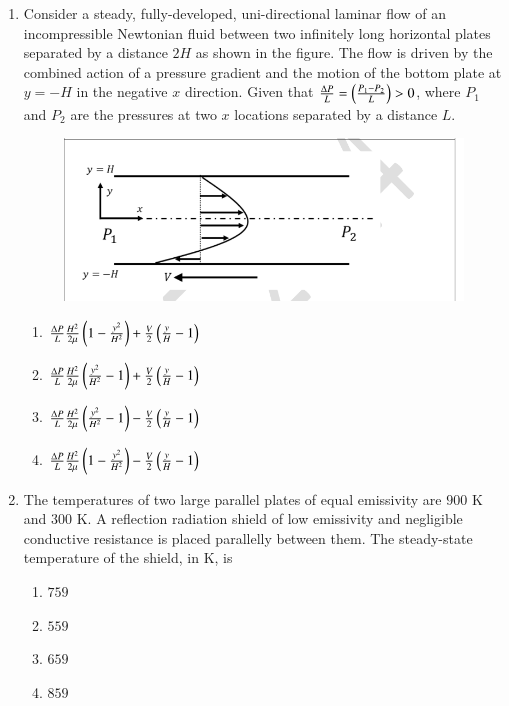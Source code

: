 \documentclass[journal,12pt,onecolumn]{IEEEtran}
\theoremstyle{remark}
\begin{document}
\begin{enumerate}
		\item Consider a steady, fully-developed, uni-directional laminar flow of an incompressible Newtonian fluid  between two infinitely long horizontal plates separated by a distance $2H$ as shown in the figure. The flow is driven by the combined action of a pressure gradient and the motion of the bottom plate at $y=-H$ in the negative $x$ direction. Given that $\frac{\Delta P}{L} = \left(\frac{P_1-P_2}{L}\right) > 0$, where $P_1$ and $P_2$ are the pressures at two $x$ locations separated by a distance $L$.
	\begin{figure}
		\includegraphics[width = 0.8\columnwidth]{q36}
		\caption*{}
		\label{fig:q36}
	\end{figure}
	\hfill{}
	

	\begin{enumerate}
		\item $\frac{\Delta P}{L}\frac{H^{2}}{2\mu}\left(1-\frac{y^{2}}{H^{2}}\right)+\frac{V}{2}\left(\frac{y}{H}-1\right)$
		\item $\frac{\Delta P}{L}\frac{H^{2}}{2\mu}\left(\frac{y^{2}}{H^{2}}-1\right)+\frac{V}{2}\left(\frac{y}{H}-1\right)$
		\item $\frac{\Delta P}{L}\frac{H^{2}}{2\mu}\left(\frac{y^{2}}{H^{2}}-1\right)-\frac{V}{2}\left(\frac{y}{H}-1\right)$
		\item $\frac{\Delta P}{L}\frac{H^{2}}{2\mu}\left(1-\frac{y^{2}}{H^{2}}\right)-\frac{V}{2}\left(\frac{y}{H}-1\right)$
	\end{enumerate}
	
	\item The temperatures of two large parallel plates of equal emissivity are $900$ K and $300$ K. A reflection radiation shield of low emissivity and negligible conductive resistance is placed parallelly between them. The steady-state temperature of the shield, in K, is
	
	\hfill{}
	\begin{enumerate}
		\item $759$
		\item $559$
		\item $659$
		\item $859$
	\end{enumerate}
	

\end{enumerate}
\end{document}
